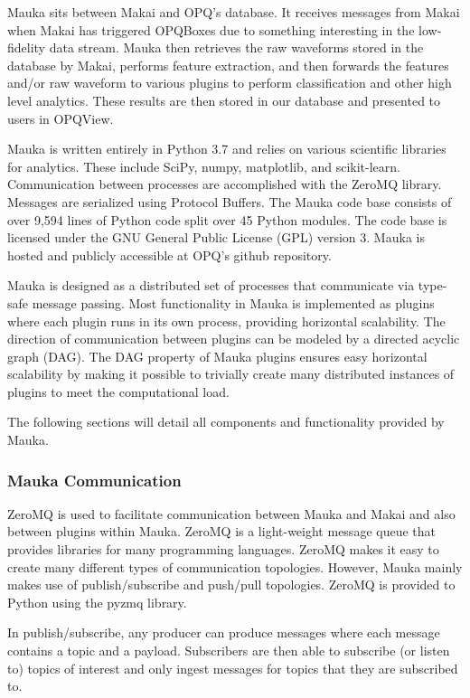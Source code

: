 Mauka sits between Makai and OPQ's database. It receives messages from Makai when Makai has triggered OPQBoxes due to something interesting in the low-fidelity data stream. Mauka then retrieves the raw waveforms stored in the database by Makai, performs feature extraction, and then forwards the features and/or raw waveform to various plugins to perform classification and other high level analytics. These results are then stored in our database and presented to users in OPQView.

Mauka is written entirely in Python 3.7\cite{python:2019} and relies on various scientific libraries for analytics. These include SciPy\cite{scipy:2019}, numpy\cite{numpy}, matplotlib\cite{matplotlib}, and scikit-learn\cite{scikitlearn}. Communication between processes are accomplished with the ZeroMQ\cite{zmq} library. Messages are serialized using Protocol Buffers\cite{protobuf}. The Mauka code base consists of over 9,594 lines of Python code split over 45 Python modules. The code base is licensed under the GNU General Public License (GPL) version 3\cite{gplv3}. Mauka is hosted and publicly accessible at OPQ's github repository\cite{opqgithub}.

Mauka is designed as a distributed set of processes that communicate via type-safe message passing. Most functionality in Mauka is implemented as plugins where each plugin runs in its own process, providing horizontal scalability. The direction of communication between plugins can be modeled by a directed acyclic graph (DAG). The DAG property of Mauka plugins ensures easy horizontal scalability by making it possible to trivially create many distributed instances of plugins to meet the computational load.

The following sections will detail all components and functionality provided by Mauka.

\subsubsection{Mauka Communication}
ZeroMQ is used to facilitate communication between Mauka and Makai and also between plugins within Mauka. ZeroMQ is a light-weight message queue that provides libraries for many programming languages. ZeroMQ makes it easy to create many different types of communication topologies. However, Mauka mainly makes use of publish/subscribe and push/pull topologies. ZeroMQ is provided to Python using the pyzmq library.

In publish/subscribe, any producer can produce messages where each message contains a topic and a payload. Subscribers are then able to subscribe (or listen to) topics of interest and only ingest messages for topics that they are subscribed to.


